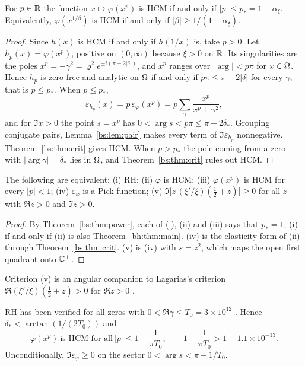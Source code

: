\begin{theorem}\label{bs:thm:power}
For $p\in\mathbb{R}$ the function $x\mapsto\varphi(x^p)$ is HCM if and only if $|p|\le p_*=1-\alpha_\xi$. Equivalently, $\varphi(x^{1/\beta})$ is HCM if and only if $|\beta|\ge1/(1-\alpha_\xi)$.
\end{theorem}

\begin{proof}
Since $h(x)$ is HCM if and only if $h(1/x)$ is, take $p>0$. Let $h_p(x)=\varphi(x^p)$, positive on $(0,\infty)$ because $\xi>0$ on $\mathbb{R}$. Its singularities are the poles $x^p=-\gamma^2=\varrho^2e^{\pm i(\pi-2|\delta|)}$, and $x^p$ ranges over $|\arg|<p\pi$ for $x\in\Omega$. Hence $h_p$ is zero free and analytic on $\Omega$ if and only if $p\pi\le\pi-2|\delta|$ for every $\gamma$, that is $p\le p_*$. When $p\le p_*$,
\[
\varepsilon_{h_p}(x)=p\,\varepsilon_\varphi(x^p)=p\sum_\gamma\frac{x^p}{x^p+\gamma^2},
\]
and for $\Im x>0$ the point $s=x^p$ has $0<\arg s<p\pi\le\pi-2\delta_*$. Grouping conjugate pairs, Lemma~\ref{bs:lem:pair} makes every term of $\Im\varepsilon_{h_p}$ nonnegative. Theorem~\ref{bs:thm:crit} gives HCM. When $p>p_*$ the pole coming from a zero with $|\arg\gamma|=\delta_*$ lies in $\Omega$, and Theorem~\ref{bs:thm:crit} rules out HCM.
\end{proof}

\begin{corollary}\label{bs:cor:rh}
The following are equivalent: (i) RH; (ii) $\varphi$ is HCM; (iii) $\varphi(x^p)$ is HCM for every $|p|<1$; (iv) $\varepsilon_\varphi$ is a Pick function; (v) $\Im\bigl[z\,(\xi'/\xi)(\tfrac12+z)\bigr]\ge0$ for all $z$ with $\Re z>0$ and $\Im z>0$.
\end{corollary}

\begin{proof}
By Theorem~\ref{bs:thm:power}, each of (i), (ii) and (iii) says that $p_*=1$; (i) if and only if (ii) is also Theorem~\ref{bh:thm:main}. (iv) is the elasticity form of (ii) through Theorem~\ref{bs:thm:crit}. (v) is (iv) with $s=z^2$, which maps the open first quadrant onto $\mathbb{C}^+$.
\end{proof}

Criterion (v) is an angular companion to Lagarias's criterion $\Re(\xi'/\xi)(\frac12+z)>0$ for $\Re z>0$ \cite{Lagarias}.

\begin{corollary}[unconditional]\label{bs:cor:uncond}
RH has been verified for all zeros with $0<\Re\gamma\le T_0=3\times10^{12}$ \cite{PT21}. Hence $\delta_*<\arctan(1/(2T_0))$ and
\[
\varphi(x^p)\ \text{is HCM for all}\ |p|\le1-\frac1{\pi T_0},\qquad 1-\frac{1}{\pi T_0}>1-1.1\times10^{-13}.
\]
Unconditionally, $\Im\varepsilon_\varphi\ge0$ on the sector $0<\arg s<\pi-1/T_0$.
\end{corollary}

